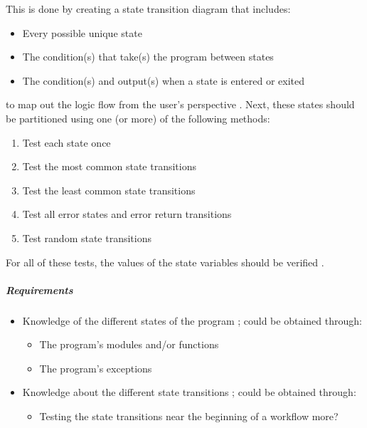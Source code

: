 This is done by creating a state transition diagram that includes:

\begin{itemize}
      \item Every possible unique state
      \item The condition(s) that take(s) the program between states
      \item The condition(s) and output(s) when a state is entered or exited
\end{itemize}

to map out the logic flow from the user's perspective
\cite[p.~81-82]{patton_software_2006}. Next, these states should be
partitioned using one (or more) of the following methods:

\begin{enumerate}
      \item Test each state once
      \item Test the most common state transitions
      \item Test the least common state transitions
      \item Test all error states and error return transitions
      \item Test random state transitions
            \cite[p.~82-83]{patton_software_2006}
\end{enumerate}

For all of these tests, the values of the state variables should be verified
\cite[p.~83]{patton_software_2006}.

\subparagraph{Requirements}
\begin{itemize}
      \item Knowledge of the different states of the program
            \cite[p.~82]{patton_software_2006}; could be obtained through:
            \begin{itemize}
                  \item The program's modules and/or functions
                  \item The program's exceptions
            \end{itemize}
      \item Knowledge about the different state transitions
            \cite[p.~82]{patton_software_2006}; could be obtained through:
            \begin{itemize}
                  \item Testing the state transitions near the beginning of a
                        workflow more?
            \end{itemize}
\end{itemize}


